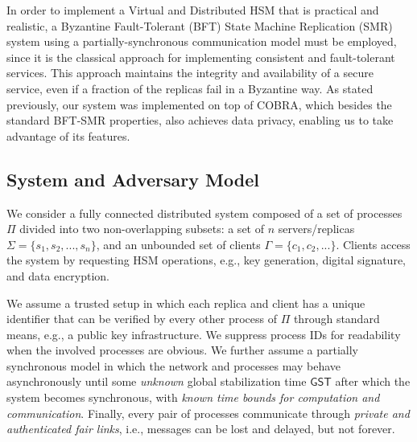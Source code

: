 \documentclass[runningheads]{llncs}
\begin{document}
In order to implement a Virtual and Distributed HSM that is practical and realistic, a Byzantine Fault-Tolerant (BFT) State Machine Replication (SMR) system using a partially-synchronous communication model must be employed, since it is the classical approach for implementing consistent and fault-tolerant services. This approach maintains the integrity and availability of a secure service, even if a fraction of the replicas fail in a Byzantine way. As stated previously, our system was implemented on top of COBRA, which besides the standard BFT-SMR properties, also achieves data privacy, enabling us to take advantage of its features.

\subsection{System and Adversary Model} \label{sec:distvirtualhsmmodel}

We consider a fully connected distributed system composed of a set of processes $\Pi$ divided into two non-overlapping subsets: a set of $n$ servers/replicas $\Sigma = \{s_1,s_2,..., s_n\}$, and an unbounded set of clients $\Gamma = \{c_1,c_2,...\}$. 
Clients access the system by requesting HSM operations, e.g., key generation, digital signature, and data encryption.

We assume a trusted setup in which each replica and client has a unique identifier that can be verified by every other process of $\Pi$ through standard means, e.g., a public key infrastructure. We suppress process IDs for readability when the involved processes are obvious. We further assume a partially synchronous model in which the network and processes may behave asynchronously until some \emph{unknown} global stabilization time $\mathsf{GST}$ after which the system becomes synchronous, with \emph{known time bounds for computation and communication}. Finally, every pair of processes communicate through \emph{private and authenticated fair links}, i.e., messages can be lost and delayed, but not forever.



\end{document}
